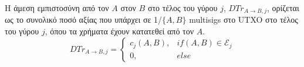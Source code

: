 {}
\begin{definition}
  Η άμεση εμπιστοσύνη από τον $A$ στον $B$ στο τέλος του γύρου $j$, $DTr_{A \rightarrow B, j}$, ορίζεται ως το συνολικό ποσό
  αξίας που υπάρχει σε 1/$\{A,B\}$ \textlatin{multisigs} στο \textlatin{UTXO} στο τέλος του γύρου $j$, όπου τα χρήματα έχουν
  κατατεθεί από τον $A$.
  \begin{equation}
    DTr_{A \rightarrow B, j} =
      \begin{cases}
        c_j\left(A, B\right), & if \left(A, B\right) \in \mathcal{E}_j \\
        0, & else
      \end{cases}
  \end{equation}
\end{definition}
